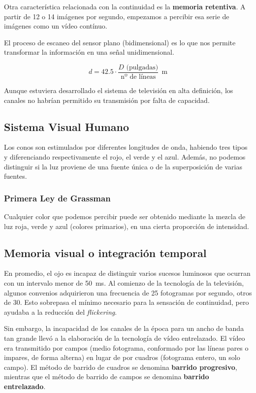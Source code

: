 \documentclass[10pt]{book}
\begin{document}
Otra característica relacionada con la continuidad es la \textbf{memoria retentiva}. A partir de 12 o 14 imágenes por segundo, empezamos a percibir esa serie de imágenes como un vídeo contínuo.

El proceso de escaneo del sensor plano (bidimensional) es lo que nos permite transformar la información en una señal unidimensional.

\[ d = 42.5 \cdot \frac{D \text{ (pulgadas)}}{\text{nº de líneas}} \ \SI{}{\metre} \]

Aunque estuviera desarrollado el sistema de televisión en alta definición, los canales no habrían permitido su transmisión por falta de capacidad.

\subsection{Sistema Visual Humano}

Los conos son estimulados por diferentes longitudes de onda, habiendo tres tipos y diferenciando respectivamente el rojo, el verde y el azul. Además, no podemos distinguir si la luz proviene de una fuente única o de la superposición de varias fuentes.

\subsubsection{Primera Ley de Grassman}

Cualquier color que podemos percibir puede ser obtenido mediante la mezcla de luz roja, verde y azul (colores primarios), en una cierta proporción de intensidad.

\subsection{Memoria visual o integración temporal}

En promedio, el ojo es incapaz de distinguir varios sucesos luminosos que ocurran con un intervalo menor de \SI{50}{\milli\second}. Al comienzo de la tecnología de la televisión, algunos convenios adquirieron una frecuencia de 25 fotogramas por segundo, otros de 30. Esto sobrepasa el mínimo necesario para la sensación de continuidad, pero ayudaba a la reducción del \textit{flickering}.

Sin embargo, la incapacidad de los canales de la época para un ancho de banda tan grande llevó a la elaboración de la tecnología de vídeo entrelazado. El vídeo era transmitido por campos (medio fotograma, conformado por las líneas pares o impares, de forma alterna) en lugar de por cuadros (fotograma entero, un solo campo). El método de barrido de cuadros se denomina \textbf{barrido progresivo}, mientras que el método de barrido de campos se denomina \textbf{barrido entrelazado}.
\end{document}
